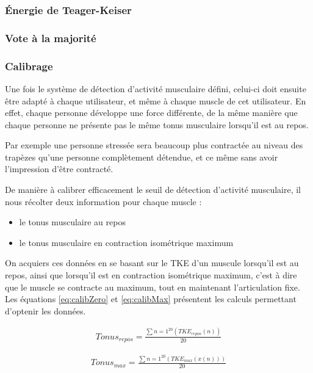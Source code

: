 \documentclass[letterpaper, twoside, 12pt, memoire, creativecommons, hyperref]{thETS}
\begin{document}
\subsubsection{Énergie de Teager-Keiser}

\subsubsection{Vote à la majorité}

\subsubsection{Calibrage}

Une fois le système de détection d'activité musculaire défini, celui-ci doit ensuite être adapté à chaque utilisateur, et même à chaque muscle de cet utilisateur. En effet, chaque personne développe une force différente, de la même manière que chaque personne ne présente pas le même tonus musculaire lorsqu'il est au repos. 

Par exemple une personne stressée sera beaucoup plus contractée au niveau des trapèzes qu'une personne complètement détendue, et ce même sans avoir l'impression d'être contracté.

De manière à calibrer efficacement le seuil de détection d'activité musculaire, il nous récolter deux information pour chaque muscle : 

\begin{itemize}
 \item le tonus musculaire au repos
 \item le tonus musculaire en contraction isométrique maximum
\end{itemize}

On acquiers ces données en se basant sur le TKE d'un muscule lorsqu'il est au repos, ainsi que lorsqu'il est en contraction isométrique maximum, c'est à dire que le muscle se contracte au maximum, tout en maintenant l'articulation fixe. Les équations \ref{eq:calibZero} et \ref{eq:calibMax} présentent les calculs permettant d'optenir les données.

\begin{align}\label{eq:validCoeffVit}
   Tonus_{repos} = \frac{\sum{n=1}^{20}(TKE_{repos}(n))}{20} 
\end{align}

\begin{align}\label{eq:validCoeffVit}
   Tonus_{max} = \frac{\sum{n=1}^{20}(TKE_{max}(x(n)))}{20} 
\end{align}
\end{document}
